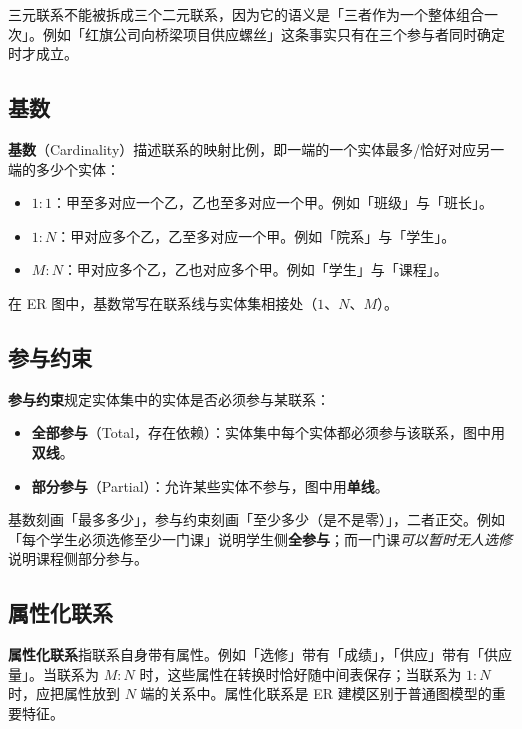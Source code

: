 三元联系不能被拆成三个二元联系，因为它的语义是「三者作为一个整体组合一次」。例如「红旗公司向桥梁项目供应螺丝」这条事实只有在三个参与者同时确定时才成立。

\subsection{基数}

\textbf{基数}（Cardinality）描述联系的映射比例，即一端的一个实体最多/恰好对应另一端的多少个实体：

\begin{itemize}
    \item \textbf{$1{:}1$}：甲至多对应一个乙，乙也至多对应一个甲。例如「班级」与「班长」。
    \item \textbf{$1{:}N$}：甲对应多个乙，乙至多对应一个甲。例如「院系」与「学生」。
    \item \textbf{$M{:}N$}：甲对应多个乙，乙也对应多个甲。例如「学生」与「课程」。
\end{itemize}

在 ER 图中，基数常写在联系线与实体集相接处（$1$、$N$、$M$）。

\subsection{参与约束}

\textbf{参与约束}规定实体集中的实体是否必须参与某联系：

\begin{itemize}
    \item \textbf{全部参与}（Total，存在依赖）：实体集中每个实体都必须参与该联系，图中用\textbf{双线}。
    \item \textbf{部分参与}（Partial）：允许某些实体不参与，图中用\textbf{单线}。
\end{itemize}

基数刻画「最多多少」，参与约束刻画「至少多少（是不是零）」，二者正交。例如「每个学生必须选修至少一门课」说明学生侧\textbf{全参与}；而一门课\emph{可以暂时无人选修}说明课程侧部分参与。

\subsection{属性化联系}

\textbf{属性化联系}指联系自身带有属性。例如「选修」带有「成绩」，「供应」带有「供应量」。当联系为 $M{:}N$ 时，这些属性在转换时恰好随中间表保存；当联系为 $1{:}N$ 时，应把属性放到 $N$ 端的关系中。属性化联系是 ER 建模区别于普通图模型的重要特征。

